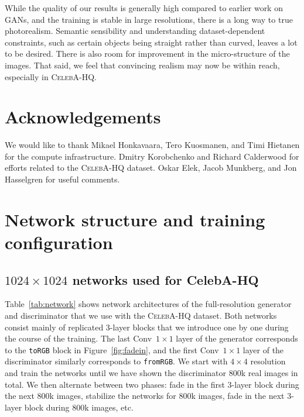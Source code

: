 \documentclass{article}
\begin{document}
While the quality of our results is generally high compared to earlier work on GANs, and the training is stable in large resolutions, there is a long way to true photorealism. Semantic sensibility and understanding dataset-dependent constraints, such as certain objects being straight rather than curved, leaves a lot to be desired. There is also room for improvement in the micro-structure of the images.
That said, we feel that convincing realism may now be within reach, especially in \textsc{CelebA-HQ}.

\section{Acknowledgements}
We would like to thank Mikael Honkavaara, Tero Kuosmanen, and Timi Hietanen for the compute infrastructure. Dmitry Korobchenko and Richard Calderwood for efforts related to the \textsc{CelebA-HQ} dataset. Oskar Elek, Jacob Munkberg, and Jon Hasselgren for useful comments.




\newpage
\appendix

\section{Network structure and training configuration}
\label{sec:network}

\subsection{$1024\times1024$ networks used for CelebA-HQ}
\label{sec:network-full}

\tabnetwork

Table~\ref{tab:network} shows network architectures of the full-resolution generator and discriminator that we use with the \textsc{CelebA-HQ} dataset.
Both networks consist mainly of replicated 3-layer blocks that we introduce one by one during the course of the training.
The last Conv~$1\times1$ layer of the generator corresponds to the \texttt{toRGB} block in Figure~\ref{fig:fadein}, and the first Conv~$1\times1$ layer of the discriminator similarly corresponds to \texttt{fromRGB}.
We start with $4\times4$ resolution and train the networks until we have shown the discriminator 800k real images in total.
We then alternate between two phases: fade in the first 3-layer block during the next 800k images, stabilize the networks for 800k images, fade in the next 3-layer block during 800k images, etc.
\end{document}
